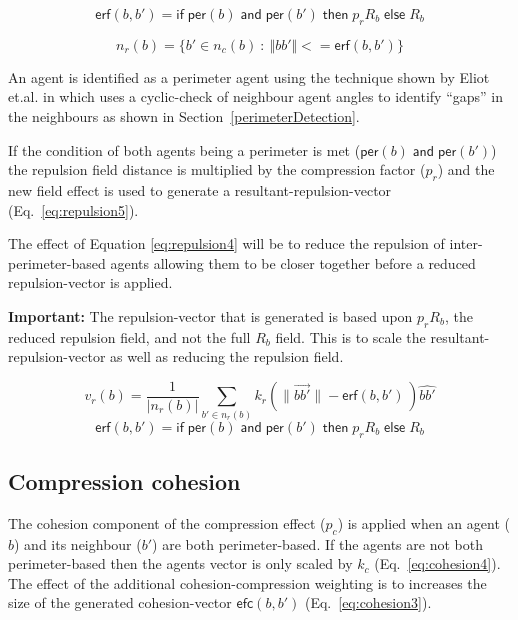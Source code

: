 \documentclass[12pt,a4paper]{IEEEtran}
\newcommand{\important}[1]{\begin{importantBox} \textbf{Important:} #1 \end{importantBox}}
\newcommand{\magn}[1]{\Vert{#1}\Vert}
\begin{document}
\small
\begin{equation}\label{eq:repulsion2}
\mathsf{erf}(b, b') = \mathsf{if} \;
\mathsf{per}(b) \; \mathsf{and} \; \mathsf{per}(b') \; \mathsf{then} \;
p_rR_b \; \mathsf{else} \; R_b
\end{equation}
\normalsize


\begin{equation}\label{eq:repulsion3}
n_r(b) = \{b' \in n_c(b)~:~\magn{bb'} <= \mathsf{erf}(b,b')\}
\end{equation}

An agent is identified as a perimeter agent using the technique shown by Eliot et.al. in \cite{eliot2019void} which uses a cyclic-check of neighbour agent angles to identify ``gaps'' in the neighbours as shown in Section~\ref{perimeterDetection}.

If the condition of both agents being a perimeter is met ($\mathsf{per}(b) \; \mathsf{and} \; \mathsf{per}(b')$) the repulsion field distance is multiplied by the compression factor ($p_r$) and the new field effect is used to generate a resultant-repulsion-vector (Eq.~\ref{eq:repulsion5}). 

The effect of Equation \ref{eq:repulsion4} will be to reduce the repulsion of inter-perimeter-based agents allowing them to be closer together before a reduced repulsion-vector is applied. 

\important{The repulsion-vector that is generated is based upon $p_rR_b$, the reduced repulsion field, and not the full $R_b$ field. This is to scale the resultant-repulsion-vector as well as reducing the repulsion field.}
\small
\begin{equation}\label{eq:repulsion4}
v_r(b) = \frac{1}{\lvert n_r(b)\rvert}\sum_{b' \in n_r(b)} k_r\left(\lVert\vec{b b'}\rVert - \mathsf{erf}(b,b') \, \right)\widehat{bb'}
\end{equation}
\normalsize
\small
\begin{equation}\label{eq:repulsion5}
\mathsf{erf}(b, b') = \mathsf{if} \;
\mathsf{per}(b) \; \mathsf{and} \; \mathsf{per}(b') \; \mathsf{then} \;
p_rR_b \; \mathsf{else} \; R_b
\end{equation}
\normalsize
\subsection{Compression cohesion}
The cohesion component of the compression effect ($p_c$) is applied when an agent ($b$) and its neighbour ($b'$) are both perimeter-based. If the agents are not both perimeter-based then the agents vector is only scaled by $k_c$ (Eq.~\ref{eq:cohesion4}). The effect of the additional cohesion-compression weighting is to increases the size of the generated cohesion-vector $\mathsf{efc}(b,b')$ (Eq.~\ref{eq:cohesion3}). 
\end{document}
